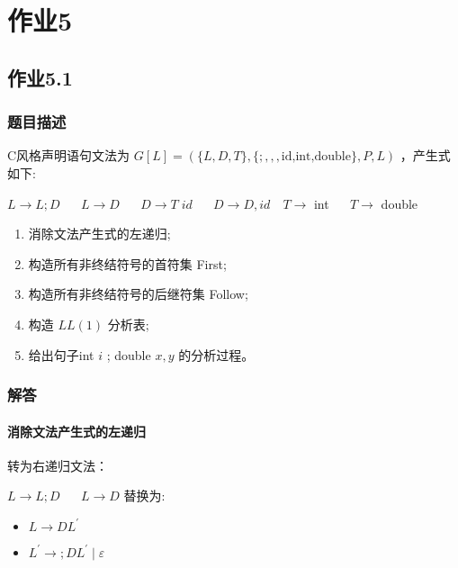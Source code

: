 
\section{作业5}
\subsection{作业5.1}
\subsubsection{题目描述}
C风格声明语句文法为 \(G\left\lbrack L\right\rbrack = \left( {\{ L,D,T\} ,\{ ;,,,\text{id,int,double}\} ,P,L}\right)\) ，产生式如下:

\(L \rightarrow L;D\) $\quad$ \(L \rightarrow D\) $\quad$ \(D \rightarrow T \;id\) $\quad$ \(D \rightarrow D,{id}\quad T \rightarrow\) int $\quad$ \(T \rightarrow\) double

\begin{enumerate}
    \item 消除文法产生式的左递归;
    \item 构造所有非终结符号的首符集 First;
    \item 构造所有非终结符号的后继符集 Follow;
    \item 构造 $LL(1)$ 分析表;
    \item 给出句子int \(i\) ; double \(x,y\) 的分析过程。
\end{enumerate}

\subsubsection{解答}

\paragraph{消除文法产生式的左递归} 转为右递归文法：

\(L \rightarrow L;D\) $\quad$ \(L \rightarrow D\) 替换为:

\begin{itemize}
    \item $L \rightarrow  D{L}^{\prime }$
    \item ${L}^{\prime } \rightarrow  ;D{L}^{\prime } \mid  \varepsilon$
\end{itemize}

